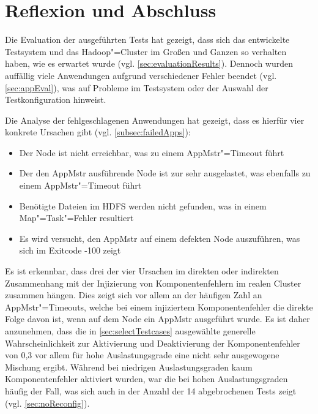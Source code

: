 \chapter{Reflexion und Abschluss}
\label{ch:outro}

Die Evaluation der ausgeführten Tests hat gezeigt, dass sich das entwickelte Testsystem und das Hadoop"=Cluster im Großen und Ganzen so verhalten haben, wie es erwartet wurde (vgl. \cref{sec:evaluationResults}).
Dennoch wurden auffällig viele Anwendungen aufgrund verschiedener Fehler beendet (vgl. \cref{sec:appEval}), was auf Probleme im Testsystem oder der Auswahl der Testkonfiguration hinweist.

Die Analyse der fehlgeschlagenen Anwendungen hat gezeigt, dass es hierfür vier konkrete Ursachen gibt (vgl. \cref{subsec:failedApps}):

\begin{itemize}
    \item Der Node ist nicht erreichbar, was zu einem \gls{AppMstr}"=Timeout führt
    \item Der den \gls{AppMstr} ausführende Node ist zur sehr ausgelastet, was ebenfalls zu einem \gls{AppMstr}"=Timeout führt
    \item Benötigte Dateien im \gls{HDFS} werden nicht gefunden, was in einem Map"=Task"=Fehler resultiert
    \item Es wird versucht, den \gls{AppMstr} auf einem defekten Node auszuführen, was sich im Exitcode -100 zeigt
\end{itemize}

Es ist erkennbar, dass drei der vier Ursachen im direkten oder indirekten Zusammenhang mit der Injizierung von Komponentenfehlern im realen Cluster zusammen hängen.
Dies zeigt sich vor allem an der häufigen Zahl an \gls{AppMstr}"=Timeouts, welche bei einem injiziertem Komponentenfehler die direkte Folge davon ist, wenn auf dem Node ein \gls{AppMstr} ausgeführt wurde.
Es ist daher anzunehmen, dass die in \cref{sec:selectTestcases} ausgewählte generelle Wahrscheinlichkeit zur Aktivierung und Deaktivierung der Komponentenfehler von 0,3 vor allem für hohe Auslastungsgrade eine nicht sehr ausgewogene Mischung ergibt.
Während bei niedrigen Auslastungsgraden kaum Komponentenfehler aktiviert wurden, war die bei hohen Auslastungsgraden häufig der Fall, was sich auch in der Anzahl der 14 abgebrochenen Tests zeigt (vgl. \cref{sec:noReconfig}).

